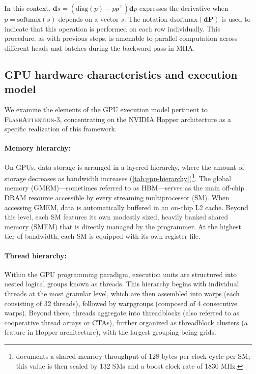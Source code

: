\begin{enumerate}
In this context, $\mathbf{d}s = (\mathrm{diag}(p) - p p^\top)\mathbf{d}p$ expresses the derivative when $p = \mathrm{softmax}(s)$ depends on a vector $s$. The notation $\mathrm{dsoftmax}(\mathbf{dP})$ is used to indicate that this operation is performed on each row individually. This procedure, as with previous steps, is amenable to parallel computation across different heads and batches during the backward pass in MHA.

\subsection{GPU hardware characteristics and execution model}
\label{subsec:hardware}

We examine the elements of the GPU execution model pertinent to \textsc{FlashAttention-3}, concentrating on the NVIDIA Hopper architecture as a specific realization of this framework.

\paragraph{Memory hierarchy:} On GPUs, data storage is arranged in a layered hierarchy, where the amount of storage decreases as bandwidth increases (\cref{tab:gpu-hierarchy})\footnote{\citet{luo2024benchmarking} documents a shared memory throughput of 128 bytes per clock cycle per SM; this value is then scaled by 132 SMs and a boost clock rate of 1830 MHz.}. The global memory (GMEM)—sometimes referred to as HBM—serves as the main off-chip DRAM resource accessible by every streaming multiprocessor (SM). When accessing GMEM, data is automatically buffered in an on-chip L2 cache. Beyond this level, each SM features its own modestly sized, heavily banked shared memory (SMEM) that is directly managed by the programmer. At the highest tier of bandwidth, each SM is equipped with its own register file.

\paragraph{Thread hierarchy:} Within the GPU programming paradigm, execution units are structured into nested logical groups known as threads. This hierarchy begins with individual threads at the most granular level, which are then assembled into warps (each consisting of 32 threads), followed by warpgroups (composed of 4 consecutive warps). Beyond these, threads aggregate into threadblocks (also referred to as cooperative thread arrays or CTAs), further organized as threadblock clusters (a feature in Hopper architecture), with the largest grouping being grids.


\end{enumerate}

